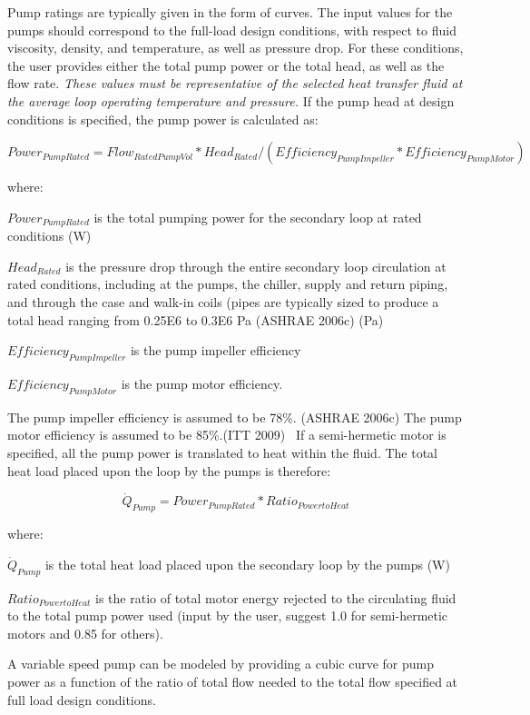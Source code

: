 Pump ratings are typically given in the form of curves. The input values for the pumps should correspond to the full-load design conditions, with respect to fluid viscosity, density, and temperature, as well as pressure drop. For these conditions, the user provides either the total pump power or the total head, as well as the flow rate. \emph{These values must be representative of the selected heat transfer fluid at the average loop operating temperature and pressure.} If the pump head at design conditions is specified, the pump power is calculated as:

\begin{equation}
Power_{PumpRated} = Flow_{RatedPumpVol}* Head_{Rated}/ (Efficiency_{PumpImpeller}*Efficiency_{PumpMotor})
\end{equation}

where:

\(Power_{PumpRated}\) is the total pumping power for the secondary loop at rated conditions (W)

\(Head_{Rated}\) is the pressure drop through the entire secondary loop circulation at rated conditions, including at the pumps, the chiller, supply and return piping, and through the case and walk-in coils (pipes are typically sized to produce a total head ranging from 0.25E6 to 0.3E6 Pa (ASHRAE 2006c) (Pa)

\(Efficiency_{PumpImpeller}\) is the pump impeller efficiency

\(Efficiency_{PumpMotor}\) is the pump motor efficiency.

The pump impeller efficiency is assumed to be 78\%. (ASHRAE 2006c) The pump motor efficiency is assumed to be 85\%.(ITT 2009)~ If a semi-hermetic motor is specified, all the pump power is translated to heat within the fluid. The total heat load placed upon the loop by the pumps is therefore:

\begin{equation}
{\dot Q_{Pump}} = Power_{PumpRated} * Ratio_{PowertoHeat}
\end{equation}

where:

\({\dot Q_{Pump}}\) is the total heat load placed upon the secondary loop by the pumps (W)

\(Ratio_{PowertoHeat}\) is the ratio of total motor energy rejected to the circulating fluid to the total pump power used (input by the user, suggest 1.0 for semi-hermetic motors and 0.85 for others).

A variable speed pump can be modeled by providing a cubic curve for pump power as a function of the ratio of total flow needed to the total flow specified at full load design conditions.

